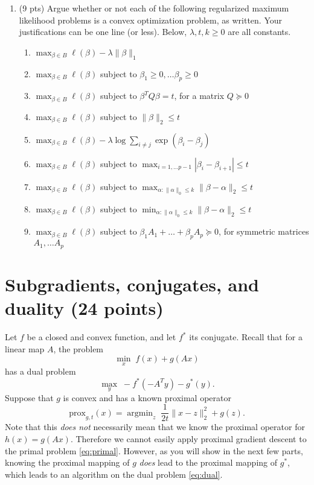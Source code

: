 \documentclass{article}
\theoremstyle{remark}
\theoremstyle{definition}
\newcommand{\argmin}{\mathop{\mathrm{argmin}}}
\def\prox{\mathrm{prox}}
\begin{document}
\begin{enumerate}
\item (9 pts) Argue whether or not each of the following regularized maximum
  likelihood problems is a convex optimization problem, as written.  Your
  justifications can be one line (or less).  Below, $\lambda,t,k \geq 0$ are all
  constants.    
\begin{enumerate}
\item $\max_{\beta \in B} \ell(\beta) - \lambda \|\beta\|_1$
\item $\max_{\beta \in B} \ell(\beta)$ subject to $\beta_1 \geq 0,
  \ldots \beta_p \geq 0$ 
\item $\max_{\beta \in B} \ell(\beta)$ subject to $\beta^T Q \beta = t$, for a 
  matrix $Q \succeq 0$
\item $\max_{\beta \in B} \ell(\beta)$ subject to $\|\beta\|_2 \leq t$
\item $\max_{\beta \in B} \ell(\beta) - \lambda \log \sum_{i\not= j}
  \exp (\beta_i-\beta_j)$
\item $\max_{\beta \in B} \ell(\beta)$ subject to 
  $\max_{i=1,\ldots p-1} |\beta_i-\beta_{i+1}| \leq t$ 
\item $\max_{\beta \in B} \ell (\beta)$ subject to $\max_{\alpha :
    \|\alpha\|_0 \leq k} \|\beta-\alpha\|_2 \leq t$ 
\item $\max_{\beta \in B} \ell (\beta)$ subject to $\min_{\alpha :
    \|\alpha\|_0 \leq k} \|\beta-\alpha\|_2 \leq t$ 
\item $\max_{\beta \in B} \ell (\beta)$ subject to $\beta_1 A_1 +
  \ldots + \beta_p A_p \succeq 0$, for symmetric matrices $A_1,\ldots A_p$
\end{enumerate}
\end{enumerate}

\section{Subgradients, conjugates, and duality (24 points)}

Let $f$ be a closed and convex function, and let $f^*$ its conjugate.  Recall
that for a linear map $A$, the problem
\begin{equation}
\label{eq:primal}
\min_x \; f(x) + g(Ax)
\end{equation}
has a dual problem
\begin{equation}
\label{eq:dual}
\max_y \; -f^*(-A^T y) - g^*(y).
\end{equation}
Suppose that $g$ is convex and has a known proximal operator   
$$
\prox_{g,t} (x) = \argmin_z \; \frac{1}{2t} \|x-z\|_2^2 + g(z).  
$$
Note that this {\it does not} necessarily mean that we know the proximal
operator for $h(x)=g(Ax)$.  Therefore we cannot easily apply proximal gradient
descent to the primal problem \eqref{eq:primal}.  However, as you will show in
the next few parts, knowing the proximal mapping of $g$ {\it does} lead to
the proximal mapping of $g^*$, which leads to an algorithm on the dual problem 
\eqref{eq:dual}.
\end{document}
